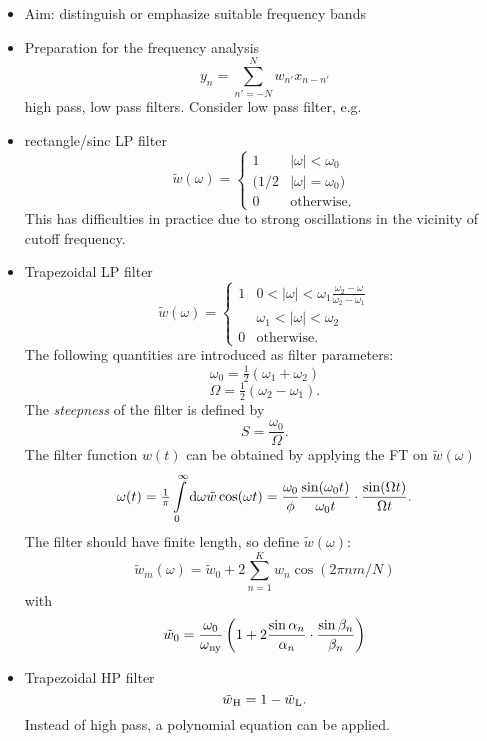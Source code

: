 \begin{enumerate}
\begin{itemize}
    \begin{itemize}
    \tightlist
    \item
      Aim: distinguish or emphasize suitable frequency bands
    \item
      Preparation for the frequency analysis
      \[ y_n = \sum_{n'=-N}^{N} w_{n'}x_{n-n'} \] high pass, low pass
      filters. Consider low pass filter, e.g.
    \item
      rectangle/sinc LP filter \[
         \tilde{w}(\omega) = \begin{cases}
                1   & |\omega|<\omega_0
           \\ (1/2  & |\omega|=\omega_0 )
            \\  0   & \text{otherwise}.
            \end{cases}
       \] This has difficulties in practice due to strong oscillations
      in the vicinity of cutoff frequency.
    \item
      Trapezoidal LP filter \[
         \tilde{w}(\omega) = \begin{cases}
                1   & 0<|\omega|<\omega_1
              \frac{\omega_2-\omega}{\omega_2-\omega_1}
           \\       & \omega_1 < |\omega| < \omega_2
            \\  0   & \text{otherwise}.
            \end{cases}
       \] The following quantities are introduced as filter parameters:
      \[
         \omega_0 = \tfrac12(\omega_1 + \omega_2)
       \] \[
         \Omega = \tfrac12(\omega_2 - \omega_1).
       \] The \emph{steepness} of the filter is defined by \[
         S = \frac{\omega_0}{\Omega}.
       \] The filter function \(w(t)\) can be obtained by applying the
      FT on \(\tilde{w}(\omega)\) \[
         \omega(t) = \tfrac1\pi \int\limits_0^{\infty}\mathrm{d}{\omega} \tilde{w}\cos(\omega t)
                   = \frac{\omega_0}{\phi}\frac{\sin(\omega_0 t)}{\omega_0t}
                       \cdot\frac{\sin(\Omega t)}{\Omega t}.
       \] The filter should have finite length, so define
      \(\tilde{w}(\omega)\): \[
         \tilde{w}_m(\omega) = \tilde{w}_0 + 2\sum_{n=1}^K w_n\cos(2\pi nm/N)
       \] with \[
         \tilde{w}_0 = \frac{\omega_0}{\omega\text{$_{\mathrm{ny}}$}}
             \left(1 + 2\frac{\sin\alpha_n}{\alpha_n}\cdot\frac{\sin\beta_n}{\beta_n}\right)
       \]
    \item
      Trapezoidal HP filter \[
         \tilde{w}\text{$_{\mathrm{H}}$} = 1 - \tilde{w}\text{$_{\mathrm{L}}$}.
       \] Instead of high pass, a polynomial equation can be applied.

\end{itemize}
\end{itemize}
\end{enumerate}

